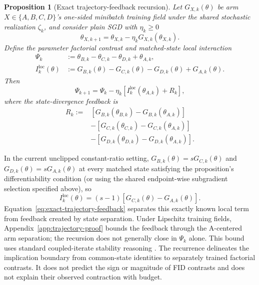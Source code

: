 \documentclass{article}
\newtheorem{proposition}{Proposition}
\begin{document}
\begin{proposition}[Exact trajectory-feedback recursion]
\label{prop:trajectory-feedback}
Let $G_{X,k}(\theta)$ be arm $X\in\{A,B,C,D\}$'s one-sided minibatch
training field under the shared stochastic realization $\zeta_k$, and consider
plain SGD with $\eta_k\geq0$
\begin{equation}
  \theta_{X,k+1}=\theta_{X,k}-\eta_kG_{X,k}(\theta_{X,k}).
  \label{eq:shared-rng-sgd}
\end{equation}
Define the parameter factorial contrast and matched-state local interaction
\begin{align}
  \Psi_k&:=\theta_{B,k}-\theta_{C,k}-\theta_{D,k}+\theta_{A,k},
  \label{eq:parameter-factorial}\\
  I_k^{\mathrm{loc}}(\theta)
  &:=G_{B,k}(\theta)-G_{C,k}(\theta)
    -G_{D,k}(\theta)+G_{A,k}(\theta).
  \label{eq:matched-local-interaction}
\end{align}
Then
\begin{equation}
  \Psi_{k+1}=\Psi_k-\eta_k
  \left[I_k^{\mathrm{loc}}(\theta_{A,k})+R_k\right],
  \label{eq:exact-trajectory-feedback}
\end{equation}
where the state-divergence feedback is
\begin{align}
  R_k:={}&
  \left[G_{B,k}(\theta_{B,k})-G_{B,k}(\theta_{A,k})\right]
  \nonumber\\[-2pt]
  &-\left[G_{C,k}(\theta_{C,k})-G_{C,k}(\theta_{A,k})\right]
  \nonumber\\[-2pt]
  &-\left[G_{D,k}(\theta_{D,k})-G_{D,k}(\theta_{A,k})\right].
  \label{eq:state-divergence-feedback}
\end{align}
\end{proposition}

In the current unclipped constant-ratio setting,
$G_{B,k}(\theta)=sG_{C,k}(\theta)$ and
$G_{D,k}(\theta)=sG_{A,k}(\theta)$ at every matched state satisfying the
proposition's differentiability condition (or using the shared endpoint-wise
subgradient selection specified above), so
\begin{equation}
  I_k^{\mathrm{loc}}(\theta)
  =(s-1)\left[G_{C,k}(\theta)-G_{A,k}(\theta)\right].
  \label{eq:constant-s-local-interaction}
\end{equation}
Equation~\eqref{eq:exact-trajectory-feedback} separates this exactly known
local term from feedback created by state separation. Under Lipschitz training
fields, Appendix~\ref{app:trajectory-proof} bounds the feedback through the
A-centered arm separation; the recursion does not generally close in
$\Psi_k$ alone. This bound uses standard coupled-iterate stability reasoning
\citep{hardt2016train}. The recurrence delineates the implication boundary from
common-state identities to separately trained factorial contrasts. It does not
predict the sign or magnitude of FID contrasts and does not explain their
observed contraction with budget.
\end{document}

